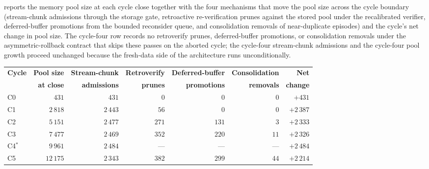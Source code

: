  reports the memory pool size at each cycle close together with the four mechanisms that move the pool size across the cycle boundary (stream-chunk admissions through the storage gate, retroactive re-verification prunes against the stored pool under the recalibrated verifier, deferred-buffer promotions from the bounded reconsider queue, and consolidation removals of near-duplicate episodes) and the cycle's net change in pool size. The cycle-four row records no retroverify prunes, deferred-buffer promotions, or consolidation removals under the asymmetric-rollback contract that skips these passes on the aborted cycle; the cycle-four stream-chunk admissions and the cycle-four pool growth proceed unchanged because the fresh-data side of the architecture runs unconditionally.

\begin{table}[!htbp]
\centering\footnotesize
\setlength{\tabcolsep}{5pt}
\renewcommand{\arraystretch}{1.1}
\begin{tabular}{@{}lrrrrrr@{}}
\toprule
\textbf{Cycle} & \textbf{Pool size} & \textbf{Stream-chunk} & \textbf{Retroverify} & \textbf{Deferred-buffer} & \textbf{Consolidation} & \textbf{Net} \\
 & \textbf{at close} & \textbf{admissions} & \textbf{prunes} & \textbf{promotions} & \textbf{removals} & \textbf{change} \\
\midrule
C0 & $431$    & $431$    & $0$ & $0$ & $0$ & $+431$ \\
C1 & $2\,818$ & $2\,443$ & $56$  & $0$   & $0$  & $+2\,387$ \\
C2 & $5\,151$ & $2\,477$ & $271$ & $131$ & $3$  & $+2\,333$ \\
C3 & $7\,477$ & $2\,469$ & $352$ & $220$ & $11$ & $+2\,326$ \\
C4$^{\ast}$ & $9\,961$ & $2\,484$ & ---   & ---   & --- & $+2\,484$ \\
C5 & $12\,175$ & $2\,343$ & $382$ & $299$ & $44$ & $+2\,214$ \\
\bottomrule
\end{tabular}

\end{table}
